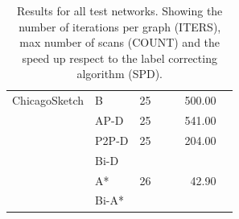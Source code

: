 \begin{table}[H]
\begin{tabular}{l l r rr rr }
        ChicagoSketch & B     & 25 & & & 500.00 & \\
        & AP-D  & 25 & & & 541.00 & \\
        & P2P-D & 25 & & & 204.00 & \\
        & Bi-D  & & & & & \\
        & A*    & 26 & & & 42.90 & \\
        & Bi-A* & & & & & \\
        \bottomrule
    \end{tabular}
    \caption{Results for all test networks. Showing the number of iterations per graph (ITERS), max number of scans (COUNT) and the speed up respect to the label correcting algorithm (SPD). }
    \label{table:allresult}
\end{table}

